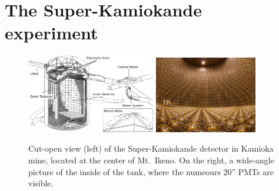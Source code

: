 \section{The Super-Kamiokande experiment}
\label{sec:sk}

\begin{figure}
	\centering
	\includegraphics[width=0.50\textwidth]{pics/superk-schematic-tags.png}
	\includegraphics[width=0.40\textwidth]{pics/superk-internal.jpeg}
	\caption{Cut-open view (left) of the Super-Kamiokande detector in Kamioka mine, %
	       located at the center of Mt.\ Ikeno.
	       On the right, a wide-angle picture of the inside of the tank, where the numeours 20'' PMTs %
	       are visible.}
	\label{fig:sk_scheme}
\end{figure}

